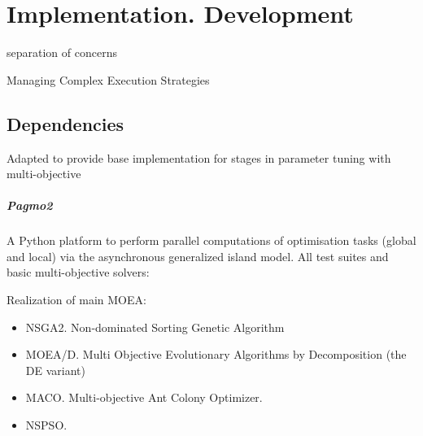 \chapter{Implementation. Development}

separation of concerns

Managing Complex Execution Strategies

\section{Dependencies}
    Adapted to provide base implementation for stages in parameter tuning with multi-objective

    \paragraph{Pagmo2} 
        A Python platform \cite{francesco_biscani_2019} to perform parallel computations of optimisation tasks (global and local) via the asynchronous generalized island model.
        All test suites and basic multi-objective solvers:

        Realization of main MOEA:
        \begin{itemize}
            \item NSGA2. Non-dominated Sorting Genetic Algorithm
            \item MOEA/D. Multi Objective Evolutionary Algorithms by Decomposition (the DE variant)
            \item MACO. Multi-objective Ant Colony Optimizer.
            \item NSPSO. 
        \end{itemize}

